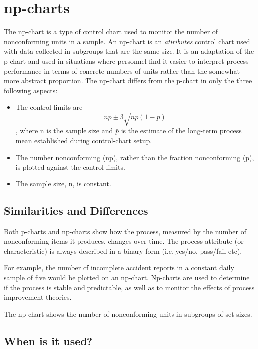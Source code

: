 \documentclass[a4paper,12pt]{article}
\begin{document}
\section{np-charts}
The np-chart is a type of control chart used to monitor the number of nonconforming units in a sample. An np-chart is an \textit{attributes} control chart used with data collected in subgroups that are the same size. 
\newline
\newline
\noindent It is an adaptation of the p-chart and used in situations where personnel find it easier to interpret process performance in terms of concrete numbers of units rather than the somewhat more abstract proportion.
\newline
\newline
\noindent The np-chart differs from the p-chart in only the three following aspects:
\begin{itemize}
\item The control limits are 
\[n\bar p \pm 3\sqrt{n\bar p(1-\bar p)}\], where n is the sample size and $\bar{p}$ is the estimate of the long-term process mean established during control-chart setup.

\item The number nonconforming (np), rather than the fraction nonconforming (p), is plotted against the control limits.

\item The sample size, n, is constant.
\end{itemize}

\subsection{Similarities and Differences}
Both p-charts and np-charts show how the process, measured by the number of nonconforming items it produces, changes over time. The process attribute (or characteristic) is always described in a binary form (i.e. yes/no, pass/fail etc). 

For example, the number of incomplete accident reports in a constant daily sample of five would be plotted on an np-chart. Np-charts are used to determine if the process is stable and predictable, as well as to monitor the effects of process improvement theories. 

The np-chart shows the number of nonconforming units in subgroups of set sizes.

\subsection{When is it used?}
\end{document}
